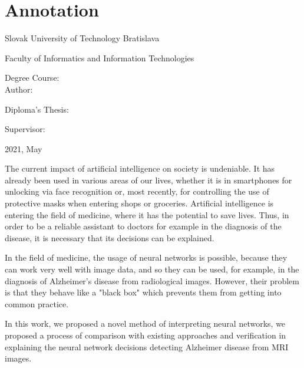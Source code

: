 
\thispagestyle{empty}

\section*{Annotation}

\begin{minipage}[t]{1\columnwidth}%
Slovak University of Technology Bratislava 

Faculty of Informatics and Information Technologies

Degree Course: \myStudyProgramEng\\

Author: \myName

Diploma's Thesis: \myTitleEng

Supervisor: \mySupervisorEng

2021, May
\end{minipage}

\bigskip{}

The current impact of artificial intelligence on society is undeniable. It has already been used in various areas of our lives, whether it is in smartphones for unlocking via face recognition or, most recently, for controlling the use of protective masks when entering shops or groceries. Artificial intelligence is entering the field of medicine, where it has the potential to save lives. Thus, in order to be a reliable assistant to doctors for example in the diagnosis of the disease, it is necessary that its decisions can be explained.

In the field of medicine, the usage of neural networks is possible, because they can work very well with image data, and so they can be used, for example, in the diagnosis of Alzheimer's disease from radiological images. However, their problem is that they behave like a "black box" which prevents them from getting into common practice.

In this work, we proposed a novel method of interpreting neural networks, we proposed a process of comparison with existing approaches and verification in explaining the neural network decisions detecting Alzheimer disease from MRI images.

\newpage
\thispagestyle{empty}
\mbox{}
\newpage